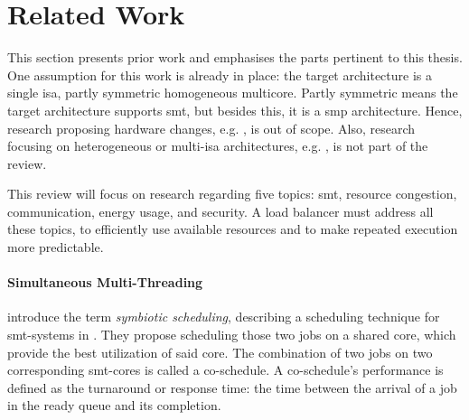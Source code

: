 \section{Related Work}
\label{state:related}

This section presents prior work and emphasises the parts pertinent to
this thesis.
One assumption for this work is already in place:
the target architecture is a single \gls{isa}, partly symmetric homogeneous
multicore.
Partly symmetric means the target architecture supports \gls{smt},
but besides this, it is a \gls{smp} architecture.
Hence, research proposing hardware changes, e.g. \cite{cruz_dynamic_2014},
is out of scope.
Also, research focusing on heterogeneous or multi-\gls{isa} architectures, e.g.
\cite{sarma_smartbalance_2015}, is not part of the review.


This review will focus on research regarding five topics: \gls{smt},
resource congestion, communication, energy usage, and security.
A load balancer must address all these topics, to efficiently use available resources
and to make repeated execution more predictable.
\\

\paragraph{Simultaneous Multi-Threading}
\citeauthor{snavely_symbiotic_2000} introduce the term \emph{symbiotic
scheduling}, describing a scheduling technique
for \gls{smt}-systems in \cite{snavely_symbiotic_2000}.
They propose scheduling those two jobs on a shared core, which provide the best
utilization of said core.
The combination of two jobs on two corresponding \gls{smt}-cores is called a
co-schedule.
A co-schedule's performance is defined as the turnaround or response time:
the time between the arrival of a job in the ready queue and its completion.

